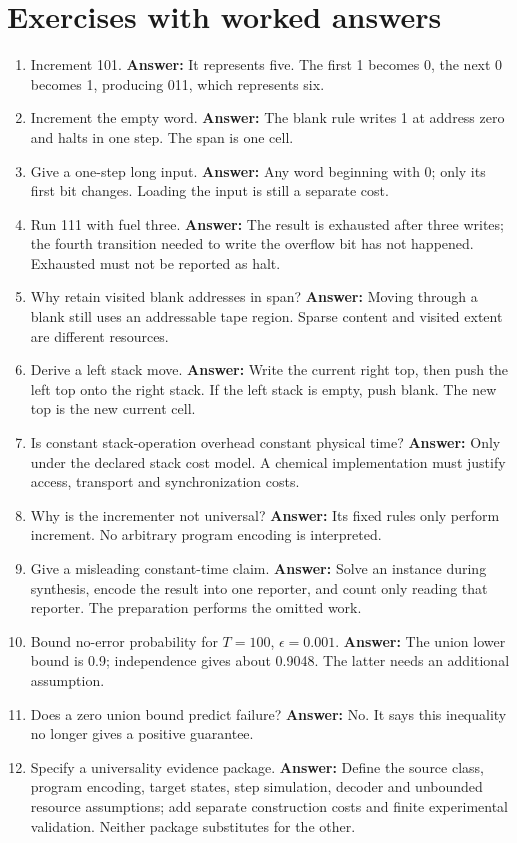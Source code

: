 \section{Exercises with worked answers}
\begin{enumerate}
\item Increment 101. \textbf{Answer:} It represents five. The first 1
becomes 0, the next 0 becomes 1, producing 011, which represents six.
\item Increment the empty word. \textbf{Answer:} The blank rule writes 1
at address zero and halts in one step. The span is one cell.
\item Give a one-step long input. \textbf{Answer:} Any word beginning with
0; only its first bit changes. Loading the input is still a separate cost.
\item Run 111 with fuel three. \textbf{Answer:} The result is exhausted
after three writes; the fourth transition needed to write the overflow bit
has not happened. Exhausted must not be reported as halt.
\item Why retain visited blank addresses in span? \textbf{Answer:} Moving
through a blank still uses an addressable tape region. Sparse content and
visited extent are different resources.
\item Derive a left stack move. \textbf{Answer:} Write the current right
top, then push the left top onto the right stack. If the left stack is
empty, push blank. The new top is the new current cell.
\item Is constant stack-operation overhead constant physical time?
\textbf{Answer:} Only under the declared stack cost model. A chemical
implementation must justify access, transport and synchronization costs.
\item Why is the incrementer not universal? \textbf{Answer:} Its fixed
rules only perform increment. No arbitrary program encoding is interpreted.
\item Give a misleading constant-time claim. \textbf{Answer:} Solve an
instance during synthesis, encode the result into one reporter, and count
only reading that reporter. The preparation performs the omitted work.
\item Bound no-error probability for $T=100$, $\epsilon=0.001$.
\textbf{Answer:} The union lower bound is 0.9; independence gives about
0.9048. The latter needs an additional assumption.
\item Does a zero union bound predict failure? \textbf{Answer:} No. It
says this inequality no longer gives a positive guarantee.
\item Specify a universality evidence package. \textbf{Answer:} Define
the source class, program encoding, target states, step simulation, decoder
and unbounded resource assumptions; add separate construction costs and
finite experimental validation. Neither package substitutes for the other.
\end{enumerate}

